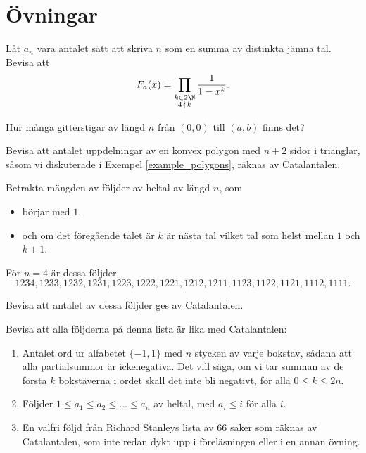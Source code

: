 \documentclass[nobib]{tufte-handout}
\begin{document}
\section{Övningar}

\begin{xca}
    Låt $a_n$ vara antalet sätt att skriva $n$ som en summa av distinkta jämna tal. Bevisa att
    $$F_a(x) = \prod_{\substack{k \in 2\N\\4\,\nmid\, k}} \frac{1}{1-x^k}.$$
\end{xca}

\begin{xca}
    Hur många gitterstigar av längd $n$ från $(0,0)$ till $(a,b)$ finns det?
\end{xca}

\begin{xca}
    Bevisa att antalet uppdelningar av en konvex polygon med $n+2$ sidor i trianglar, såsom vi diskuterade i Exempel \ref{example_polygons}, räknas av Catalantalen.
\end{xca}

\begin{xca}
    Betrakta mängden av följder av heltal av längd $n$, som
    \begin{itemize}
        \item börjar med $1$,
        \item och om det föregående talet är $k$ är nästa tal vilket tal som helst mellan $1$ och $k+1$.
    \end{itemize} 

    För $n = 4$ är dessa följder
    $$1234, 1233, 1232, 1231, 1223, 1222, 1221, 1212, 1211, 1123, 1122, 1121, 1112, 1111.$$

    Bevisa att antalet av dessa följder ges av Catalantalen.
\end{xca}

\begin{xca}
    Bevisa att alla följderna på denna lista är lika med Catalantalen:
    \begin{enumerate}
        \item Antalet ord ur alfabetet $\{-1, 1\}$ med $n$ stycken av varje bokstav, sådana att alla partialsummor är ickenegativa. Det vill säga, om vi tar summan av de första $k$ bokstäverna i ordet skall det inte bli negativt, för alla $0 \leq k \leq 2n$.
        \item Följder $1 \leq a_1 \leq a_2 \leq \ldots \leq a_n$ av heltal, med $a_i \leq i$ för alla $i$.
        \item En valfri följd från Richard Stanleys lista av 66 saker som räknas av Catalantalen, som inte redan dykt upp i föreläsningen eller i en annan övning.
    \end{enumerate}
\end{xca}
\end{document}
